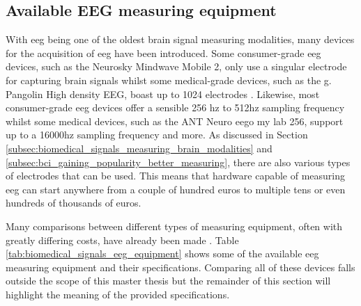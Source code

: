 
\subsection{Available EEG measuring equipment}
\label{subsec:biomedical_signals_measuring_brain_equipment}

With \gls{eeg} being one of the oldest brain signal measuring modalities, many devices for the acquisition of \gls{eeg} have been introduced.
Some consumer-grade \gls{eeg} devices, such as the Neurosky Mindwave Mobile 2, only use a singular electrode for capturing brain signals whilst some medical-grade devices, such as the g. Pangolin High density EEG, boast up to 1024 electrodes \citep{bci_cheap_viability5}.
Likewise, most consumer-grade \gls{eeg} devices offer a sensible 256 \gls{hz} to 512\gls{hz} sampling frequency whilst some medical devices, such as the ANT Neuro eego my lab 256, support up to a 16000\gls{hz} sampling frequency and more.
As discussed in Section \ref{subsec:biomedical_signals_measuring_brain_modalities} and \ref{subsec:bci_gaining_popularity_better_measuring}, there are also various types of electrodes that can be used.
This means that hardware capable of measuring \gls{eeg} can start anywhere from a couple of hundred euros to multiple tens or even hundreds of thousands of euros.

Many comparisons between different types of measuring equipment, often with greatly differing costs, have already been made \citep{bci_cheap_viability1, bci_cheap_viability2, bci_cheap_viability3, bci_cheap_viability4, bci_cheap_viability5, low_cost_eeg_devices, muse_comparison}.
Table \ref{tab:biomedical_signals_eeg_equipment} shows some of the available \gls{eeg} measuring equipment and their specifications.
Comparing all of these devices falls outside the scope of this master thesis but the remainder of this section will highlight the meaning of the provided specifications.


